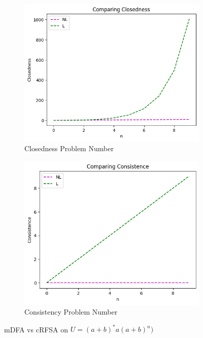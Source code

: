 \begin{figure}[!htb]
\begin{subfigure}[b]{0.25\textwidth}
    \includegraphics[width=\textwidth]{../statistics/plots/wrostDFA/Closedness.png}
    \caption{Closedness Problem Number}
    \label{fig:ClosednessWrostDFACompare}
  \end{subfigure}
  \begin{subfigure}[b]{0.25\textwidth}
    \includegraphics[width=\textwidth]{../statistics/plots/wrostDFA/Consistence.png}
    \caption{Consistency Problem Number}
    \label{fig:ConsistenceWrostDFACompare}
  \end{subfigure}
  \caption{mDFA vs cRFSA on $U = (a+b)^*a(a+b)^n)$}
  \label{fig:wrostDFA}
\end{figure}

